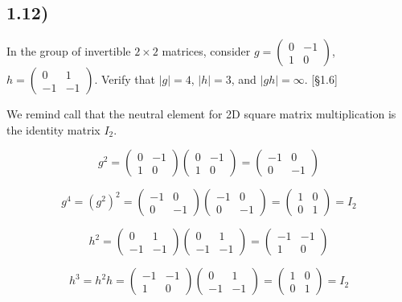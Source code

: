 \documentclass[12pt, letterpaper, twoside]{report}
\begin{document}
\subsection*{1.12)}

In the group of invertible $2 \times 2$ matrices, consider $g = \begin{pmatrix} 0 & -1 \\ 1 & 0 \end{pmatrix}$, $h = \begin{pmatrix} 0 & 1 \\ -1 & -1 \end{pmatrix}$. Verify that $|g| = 4$, $|h| = 3$, and $|gh| = \infty$. [§1.6]

We remind call that the neutral element for 2D square matrix multiplication is the identity matrix $I_2$.

$$
g^2 = \begin{pmatrix} 0 & -1 \\ 1 & 0 \end{pmatrix} \begin{pmatrix} 0 & -1 \\ 1 & 0 \end{pmatrix}
    = \begin{pmatrix} -1 & 0 \\ 0 & -1 \end{pmatrix}
$$

$$
g^4 = (g^2)^2
    = \begin{pmatrix} -1 & 0 \\ 0 & -1 \end{pmatrix} \begin{pmatrix} -1 & 0 \\ 0 & -1 \end{pmatrix}
    = \begin{pmatrix}  1 & 0 \\ 0 &  1 \end{pmatrix}
    = I_2
$$

$$
h^2 = \begin{pmatrix} 0 & 1 \\ -1 & -1 \end{pmatrix} \begin{pmatrix} 0 & 1 \\ -1 & -1 \end{pmatrix} 
	= \begin{pmatrix} -1 & -1 \\ 1 & 0 \end{pmatrix}
$$

$$
h^3 = h^2 h
    = \begin{pmatrix} -1 & -1 \\ 1 & 0 \end{pmatrix} \begin{pmatrix} 0 & 1 \\ -1 & -1 \end{pmatrix}
	= \begin{pmatrix} 1 & 0 \\ 0 & 1 \end{pmatrix}
	= I_2
$$
\end{document}
